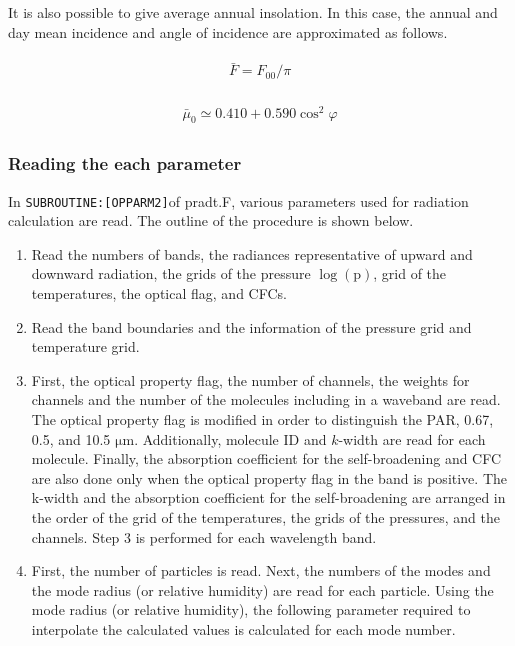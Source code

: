 It is also possible to give average annual insolation. In this case, the
annual and day mean incidence and angle of incidence are approximated as
follows.

\begin{eqnarray}
\begin{array}{c}
\bar{F}=F_{00} / \pi
\end{array}
\end{eqnarray}

\begin{eqnarray}
\begin{array}{c}
\bar{\mu}_{0} \simeq 0.410+0.590 \cos ^{2} \varphi
\end{array}
\end{eqnarray}

\hypertarget{reading-the-each-parameter}{%
\subsubsection{Reading the each
parameter}\label{reading-the-each-parameter}}

In \texttt{SUBROUTINE:{[}OPPARM2{]}}of pradt.F, various parameters used
for radiation calculation are read. The outline of the procedure is
shown below.

\begin{enumerate}
\def\labelenumi{\arabic{enumi}.}
\item
  Read the numbers of bands, the radiances representative of upward and
  downward radiation, the grids of the pressure \(\log (\mathrm{p})\),
  grid of the temperatures, the optical flag, and CFCs.
\item
  Read the band boundaries and the information of the pressure grid and
  temperature grid.
\item
  First, the optical property flag, the number of channels, the weights
  for channels and the number of the molecules including in a waveband
  are read. The optical property flag is modified in order to
  distinguish the PAR, 0.67, 0.5, and 10.5 \(\mathrm{{\mu}m}\).
  Additionally, molecule ID and \(k\)-width are read for each molecule.
  Finally, the absorption coefficient for the self-broadening and CFC
  are also done only when the optical property flag in the band is
  positive. The k-width and the absorption coefficient for the
  self-broadening are arranged in the order of the grid of the
  temperatures, the grids of the pressures, and the channels. Step 3 is
  performed for each wavelength band.
\item
  First, the number of particles is read. Next, the numbers of the modes
  and the mode radius (or relative humidity) are read for each particle.
  Using the mode radius (or relative humidity), the following parameter
  required to interpolate the calculated values is calculated for each
  mode number.
\end{enumerate}


